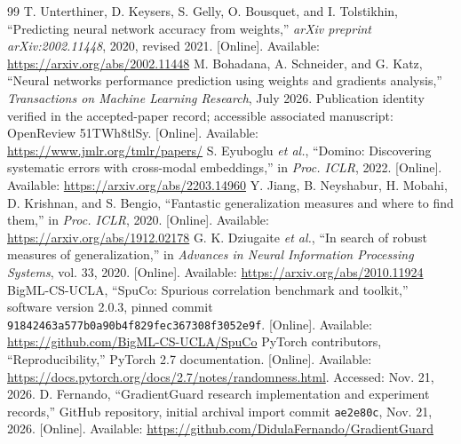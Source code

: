 \begin{thebibliography}{99}
 T. Unterthiner, D. Keysers, S. Gelly, O. Bousquet, and I. Tolstikhin, ``Predicting neural network accuracy from weights,'' \emph{arXiv preprint arXiv:2002.11448}, 2020, revised 2021. [Online]. Available: \url{https://arxiv.org/abs/2002.11448}
 M. Bohadana, A. Schneider, and G. Katz, ``Neural networks performance prediction using weights and gradients analysis,'' \emph{Transactions on Machine Learning Research}, July 2026. Publication identity verified in the accepted-paper record; accessible associated manuscript: OpenReview 51TWh8tlSy. [Online]. Available: \url{https://www.jmlr.org/tmlr/papers/}
 S. Eyuboglu \emph{et al.}, ``Domino: Discovering systematic errors with cross-modal embeddings,'' in \emph{Proc. ICLR}, 2022. [Online]. Available: \url{https://arxiv.org/abs/2203.14960}
 Y. Jiang, B. Neyshabur, H. Mobahi, D. Krishnan, and S. Bengio, ``Fantastic generalization measures and where to find them,'' in \emph{Proc. ICLR}, 2020. [Online]. Available: \url{https://arxiv.org/abs/1912.02178}
 G. K. Dziugaite \emph{et al.}, ``In search of robust measures of generalization,'' in \emph{Advances in Neural Information Processing Systems}, vol. 33, 2020. [Online]. Available: \url{https://arxiv.org/abs/2010.11924}
 BigML-CS-UCLA, ``SpuCo: Spurious correlation benchmark and toolkit,'' software version 2.0.3, pinned commit \texttt{91842463a577b0a90b4f829fec367308f3052e9f}. [Online]. Available: \url{https://github.com/BigML-CS-UCLA/SpuCo}
 PyTorch contributors, ``Reproducibility,'' PyTorch 2.7 documentation. [Online]. Available: \url{https://docs.pytorch.org/docs/2.7/notes/randomness.html}. Accessed: Nov. 21, 2026.
 D. Fernando, ``GradientGuard research implementation and experiment records,'' GitHub repository, initial archival import commit \texttt{ae2e80c}, Nov. 21, 2026. [Online]. Available: \url{https://github.com/DidulaFernando/GradientGuard}
\end{thebibliography}
